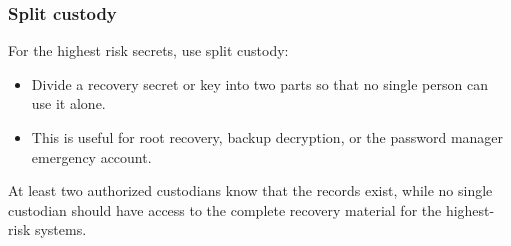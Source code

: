 \subsubsection{Split custody}

For the highest risk secrets, use split custody:
\begin{itemize}
    \item Divide a recovery secret or key into two parts so that no single person can use it alone.
    \item This is useful for root recovery, backup decryption, or the password manager emergency account.
\end{itemize}

At least two authorized custodians \should{} know that the records exist, while no single custodian should have access to the complete recovery material for the highest-risk systems.